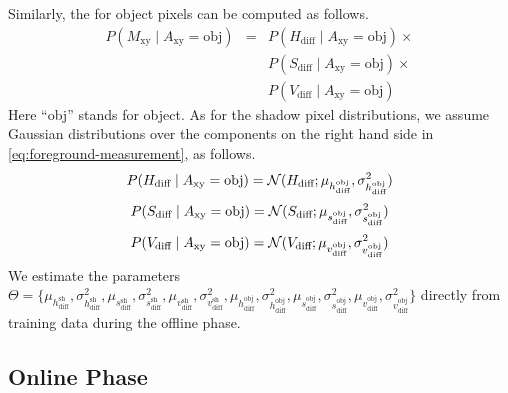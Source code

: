 \DIFaddend Similarly, the \DIFdelbegin {}\DIFdelend \DIFaddbegin {}\DIFaddend for 
object pixels can be computed as follows.
\begin{equation}
  \label{eq:foreground-measurement}
  \begin{array}{ccl}
    P(M_{\text{xy}} \mid A_{\text{xy}} = \text{obj}) 
            & = & P(H_{\text{diff}} \mid A_{\text{xy}} = \text{obj}) \times \\
            &   & P(S_{\text{diff}} \mid A_{\text{xy}} = \text{obj}) \times \\
            &   & P(V_{\text{diff}} \mid A_{\text{xy}} = \text{obj})
  \end{array}
\end{equation}
Here ``obj'' stands for object. As for the shadow pixel distributions,
we assume Gaussian distributions over the components on the right hand
side in \ref{eq:foreground-measurement}, as follows.
\begin{equation*}
  P(H_{\text{diff}} \mid A_{\text{xy}} = \text{obj}) =
  {\cal N}(H_{\text{diff}} ;
  \mu_{h_{\text{diff}}^{\text{obj}}},
  \sigma^2_{h_{\text{diff}}^{\text{obj}}})
\end{equation*}
\begin{equation*}
  P(S_{\text{diff}} \mid A_{\text{xy}} = \text{obj}) =
  {\cal N}(S_{\text{diff}} ;
  \mu_{s_{\text{diff}}^{\text{obj}}},
  \sigma^2_{s_{\text{diff}}^{\text{obj}}})
\end{equation*}
\begin{equation*}
  P(V_{\text{diff}} \mid A_{\text{xy}} = \text{obj}) =
  {\cal N}(V_{\text{diff}} ;
  \mu_{v_{\text{diff}}^{\text{obj}}},
  \sigma^2_{v_{\text{diff}}^{\text{obj}}})
\end{equation*}
We estimate the parameters $\Theta = \{
\mu_{h_{\text{diff}}^{\text{sh}}},
\sigma^2_{h_{\text{diff}}^{\text{sh}}},
\mu_{s_{\text{diff}}^{\text{sh}}},
\sigma^2_{s_{\text{diff}}^{\text{sh}}},
\mu_{v_{\text{diff}}^{\text{sh}}},
\sigma^2_{v_{\text{diff}}^{\text{sh}}},
\mu_{h_{\text{diff}}^{\text{obj}}},
\sigma^2_{h_{\text{diff}}^{\text{obj}}},
\mu_{s_{\text{diff}}^{\text{obj}}},
\sigma^2_{s_{\text{diff}}^{\text{obj}}},
\mu_{v_{\text{diff}}^{\text{obj}}},
\sigma^2_{v_{\text{diff}}^{\text{obj}}} \}$ directly from training
data during the offline phase.

\subsection{Online Phase}

